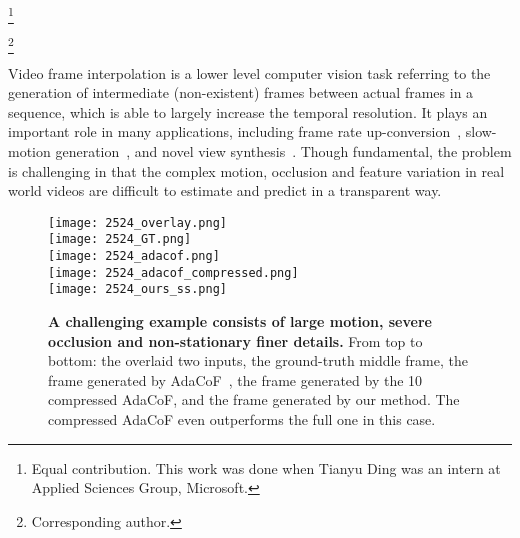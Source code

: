 \documentclass[final]{cvpr}
\newcommand\blfootnote[1]{\begingroup
  \renewcommand\thefootnote{}\footnote{#1}\addtocounter{footnote}{-1}\endgroup
}
\begin{document}
\blfootnote{Equal contribution. This work was done when Tianyu Ding was an intern at Applied Sciences Group, Microsoft.}
\blfootnote{Corresponding author.}\hspace{-.06in}Video frame interpolation is a lower level computer vision task referring to the generation of intermediate (non-existent) frames between actual frames in a sequence, which is able to largely increase the temporal resolution. It plays an important role in many applications, including frame rate up-conversion~\cite{bao2018high}, slow-motion generation~\cite{jiang2018super}, and novel view synthesis~\cite{flynn2016deepstereo,zhou2016view}. Though fundamental, the problem is challenging in that the complex motion, occlusion and feature variation in real world videos are difficult to estimate and predict in a transparent way. 


\begin{figure}[]
    \centering
    \texttt{[image: 2524\_overlay.png]}\\
    \texttt{[image: 2524\_GT.png]}\\
     \texttt{[image: 2524\_adacof.png]}\\
     \texttt{[image: 2524\_adacof\_compressed.png]}\\
     \texttt{[image: 2524\_ours\_ss.png]}
    \caption{\textbf{A challenging example consists of large motion, severe occlusion and non-stationary finer details.} From top to bottom: the overlaid two inputs, the ground-truth middle frame, the frame generated by AdaCoF~\cite{lee2020adacof},
    the frame generated by the 10 compressed AdaCoF, and the frame generated by our method. The compressed AdaCoF even outperforms the full one in this case.}
    \label{fig:example}
    \vspace{-.25in}
\end{figure}
\end{document}
